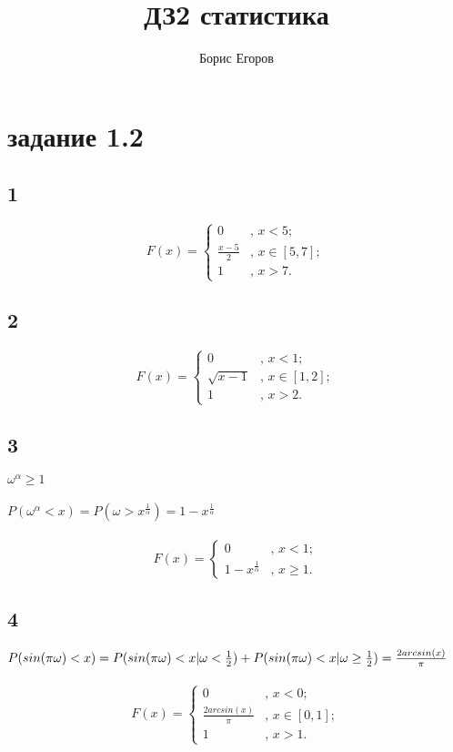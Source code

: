 \documentclass[a4paper]{article}
\author{Борис Егоров}
\title{ДЗ2 статистика}
\begin{document}
	\maketitle
	\section*{задание 1.2}
	\begin{large}
		\subsection*{1}
		\[ F(x) = \left\{ \begin{array}{ll}
			0 & \mbox{, $x<5$};\\
			\frac{x-5}{2} & \mbox{, $x \in [5, 7]$};\\
			1 & \mbox{, $x>7$}.\end{array} \right. \]
		\subsection*{2}
			\[ F(x) = \left\{ \begin{array}{ll}
			0 & \mbox{, $x<1$};\\
			\sqrt{x-1} & \mbox{, $x \in [1, 2]$};\\
			1 & \mbox{, $x>2$}.\end{array} \right. \]
		\subsection*{3}
		$\omega^{\alpha}\ge 1$\\
		\\
		$P(\omega^{\alpha}<x)=P(\omega > x^{\frac{1}{\alpha}})=1-x^{\frac{1}{\alpha}}$\\
		\\
		\[ F(x) = \left\{ \begin{array}{ll}
			0 & \mbox{, $x<1$};\\
			1-x^{\frac{1}{\alpha}} & \mbox{, $x\ge 1$}.\end{array} \right. \]
		\subsection*{4}
		$P(sin(\pi \omega)<x)=P(sin(\pi \omega)<x |\omega<\frac{1}{2})+P(sin(\pi \omega)<x |\omega \ge \frac{1}{2})\\=
		\frac{2arcsin(x)}{\pi}$\\
		\\
		\[ F(x) = \left\{ \begin{array}{ll}
			0 & \mbox{, $x<0$};\\
			\frac{2arcsin(x)}{\pi} & \mbox{, $x \in [0,1]$};\\
			1 & \mbox{, $x>1$}.\end{array} \right. \]

\end{large}
\end{document}
